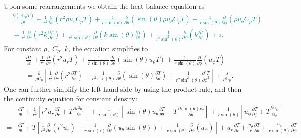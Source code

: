 \documentclass[12pt]{article}
\begin{document}
\begin{ex}
\begin{solution}
\begin{align*}
  \end{align*}
  Upon some rearrangements we obtain the heat balance equation as\textcolor{teal}{
  \begin{align*}
    &\frac{\partial(\rho C_p T)}{\partial t}+\frac{1}{r^2}\frac{\partial}{\partial r}\left(r^2\rho u_rC_pT\right)+\frac{1}{r\sin(\theta)}\frac{\partial}{\partial\theta}\left(\sin(\theta)\rho u_{\theta}C_pT\right)+\frac{1}{r\sin(\theta)}\frac{\partial}{\partial\phi}\left(\rho u_{\phi}C_pT\right)\\
    &=\frac{1}{r^2}\frac{\partial}{\partial r}\left(r^2k\frac{\partial T}{\partial r}\right)+\frac{1}{r^2\sin(\theta)}\frac{\partial}{\partial\theta}\left(k\sin(\theta)\frac{\partial T}{\partial \theta}\right)+\frac{1}{r^2\sin^2(\theta)}\frac{\partial}{\partial\phi}\left(k\frac{\partial T}{\partial \phi}\right)+s.
  \end{align*}}%
  For constant $\rho,\;C_p,\;k$, the equation simplifies to
  \begin{align*}
    &\frac{\partial T}{\partial t}+\frac{1}{r^2}\frac{\partial}{\partial r}\left(r^2u_rT\right)+\frac{1}{r\sin(\theta)}\frac{\partial}{\partial\theta}\left(\sin(\theta)u_{\theta}T\right)+\frac{1}{r\sin(\theta)}\frac{\partial}{\partial\phi}\left(u_{\phi}T\right)\\
    &=\frac{k}{\rho C_p}\left[\frac{1}{r^2}\frac{\partial}{\partial r}\left(r^2\frac{\partial T}{\partial r}\right)+\frac{1}{r^2\sin(\theta)}\frac{\partial}{\partial\theta}\left(\sin(\theta)\frac{\partial T}{\partial \theta}\right)+\frac{1}{r^2\sin^2(\theta)}\frac{\partial^2 T}{{\partial \phi}^2}\right]+\frac{s}{\rho C_p}.
  \end{align*}
  One can further simplify the left hand side by using the product rule, and then the continuity equation for constant density:
  \begin{align*}
    &\frac{\partial T}{\partial t}+\frac{1}{r^2}\left[r^2u_r\frac{\partial T}{\partial r}+T\frac{\partial r^2u_r}{\partial r}\right]+\frac{1}{r\sin(\theta)}\left[\sin(\theta)u_{\theta}\frac{\partial T}{\partial \theta}+T\frac{\partial \sin(\theta)u_{\theta}}{\partial \theta}\right]+\frac{1}{r\sin(\theta)}\left[u_{\phi}\frac{\partial T}{\partial \phi}+T\frac{\partial u_{\phi}}{\partial \phi}\right]\\
    =&\frac{\partial T}{\partial t}+T\left[\frac{1}{r^2}\frac{\partial}{\partial r}(r^2 u_r)+\frac{1}{r\sin(\theta)}\frac{\partial}{\partial\theta}(u_{\theta}\sin(\theta))+\frac{1}{r\sin(\theta)}\frac{\partial}{\partial\phi}(u_{\phi})\right]+u_r\frac{\partial T}{\partial r}+\frac{u_{\theta}}{r}\frac{\partial T}{\partial\theta}+\frac{u_{\phi}}{r\sin(\theta)}\frac{\partial T}{\partial\phi}\\

\end{align*}
\end{solution}
\end{ex}
\end{document}
